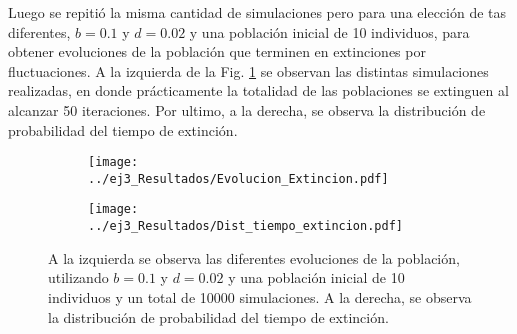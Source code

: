 Luego se repitió la misma cantidad de simulaciones pero para una elección de tas diferentes, $b=0.1$ y $d=0.02$ y una población inicial de 10 individuos, para obtener evoluciones de la población que terminen en extinciones por fluctuaciones. A la izquierda de la Fig. \ref{ej3:Resultados_b} se observan las distintas simulaciones realizadas, en donde prácticamente la totalidad de las poblaciones se extinguen al alcanzar 50 iteraciones. Por ultimo, a la derecha, se observa la distribución de probabilidad del tiempo de extinción.

\begin{figure}[htb!]
    \centering
    \begin{subfigure}[b]{0.49\textwidth}
        \texttt{[image: ../ej3\_Resultados/Evolucion\_Extincion.pdf]}
    \end{subfigure}
    \begin{subfigure}[b]{0.49\textwidth}
        \texttt{[image: ../ej3\_Resultados/Dist\_tiempo\_extincion.pdf]}
    \end{subfigure}
    \caption{A la izquierda se observa las diferentes evoluciones de la población, utilizando $b=0.1$ y $d=0.02$ y una población inicial de 10 individuos y un total de 10000 simulaciones. A la derecha, se observa la distribución de probabilidad del tiempo de extinción.}
    \label{ej3:Resultados_b}
\end{figure}

